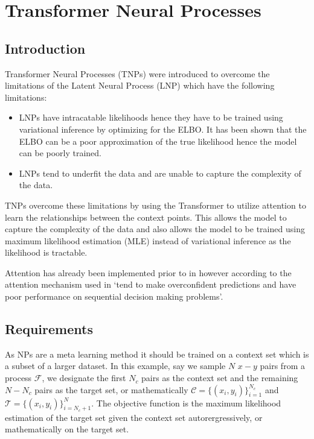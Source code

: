 \documentclass[main.tex]{subfiles}
\begin{document}
\section{Transformer Neural Processes}

\subsection{Introduction}

Transformer Neural Processes (TNPs) \cite{nguyen2023transformer} were introduced to overcome the limitations of the Latent Neural Process (LNP) \cite{garnelo2018neural} which have the following limitations:

\begin{itemize}
	\item LNPs have intracatable likelihoods hence they have to be trained using variational inference by optimizing for the ELBO. It has been shown that the ELBO can be a poor approximation of the true likelihood hence the model can be poorly trained.
	\item LNPs tend to underfit the data and are unable to capture the complexity of the data.
\end{itemize}

TNPs overcome these limitations by using the Transformer \cite{vaswani2017attention} to utilize attention to learn the relationships between the context points. This allows the model to capture the complexity of the data and also allows the model to be trained using maximum likelihood estimation (MLE) instead of variational inference as the likelihood is tractable.

Attention has already been implemented prior to \cite{nguyen2023transformer} in \cite{kim2019attentive} however according to \cite{nguyen2023transformer} the attention mechanism used in \cite{kim2019attentive} `tend to make overconfident predictions and have poor performance on sequential decision making problems'.

\subsection{Requirements}

As NPs are a meta learning method it should be trained on a context set which is a subset of a larger dataset. In this example, say we sample $N$ $x-y$ pairs from a process $\mathcal{F}$, we designate the first $N_c$ pairs as the context set and the remaining $N-N_c$ pairs as the target set, or mathematically $\mathcal{C} = \{(x_i, y_i)\}_{i=1}^{N_c}$ and $\mathcal{T} = \{(x_i, y_i)\}_{i=N_c+1}^{N}$. The objective function is the maximum likelihood estimation of the target set given the context set autorergressively, or mathematically on the target set.
\end{document}
